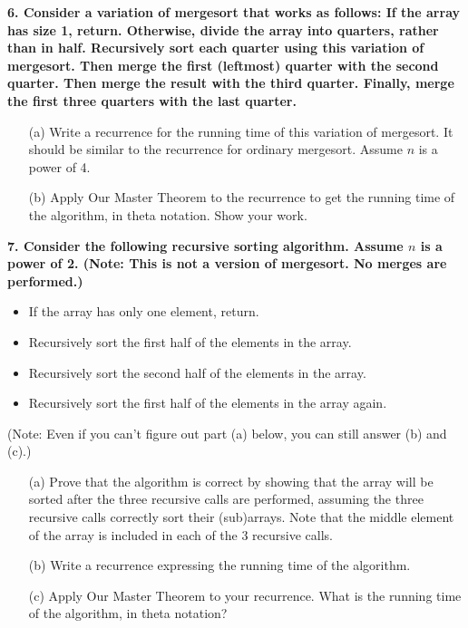 \documentclass{article}
\begin{document}
\vspace{1cm}

\noindent \textbf{6. Consider a variation of mergesort that works as follows: If the array has size 1, return. Otherwise, divide the array into quarters, rather than in half. Recursively sort each quarter using this variation of mergesort. Then merge the first (leftmost) quarter with the second quarter. Then merge the result with the third quarter. Finally, merge the first three quarters with the last quarter.}

\begin{enumerate}
    \item[(a)] Write a recurrence for the running time of this variation of mergesort. It should be similar to the recurrence for ordinary mergesort. Assume $n$ is a power of 4.
    \item[(b)] Apply Our Master Theorem to the recurrence to get the running time of the algorithm, in theta notation. Show your work.
\end{enumerate}

\vspace{1cm}

\noindent \textbf{7. Consider the following recursive sorting algorithm. Assume $n$ is a power of 2. (Note: This is not a version of mergesort. No merges are performed.)}

\begin{itemize}
    \item If the array has only one element, return.
    \item Recursively sort the first half of the elements in the array.
    \item Recursively sort the second half of the elements in the array.
    \item Recursively sort the first half of the elements in the array again.
\end{itemize}
(Note: Even if you can’t figure out part (a) below, you can still answer (b) and (c).)

\begin{enumerate}
    \item[(a)] Prove that the algorithm is correct by showing that the array will be sorted after the three recursive calls are performed, assuming the three recursive calls correctly sort their (sub)arrays. Note that the middle element of the array is included in each of the 3 recursive calls.
    \item[(b)] Write a recurrence expressing the running time of the algorithm.
    \item[(c)] Apply Our Master Theorem to your recurrence. What is the running time of the algorithm, in theta notation?
\end{enumerate}
\end{document}
